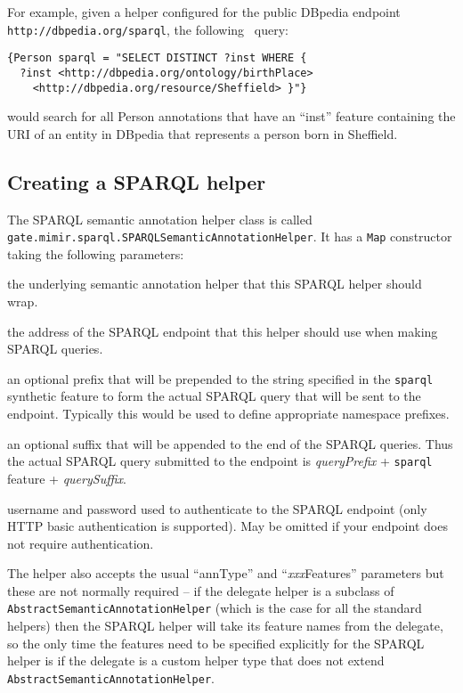 For example, given a helper configured for the public DBpedia endpoint
{\tt http://dbpedia.org/sparql}, the following \Mimir\ query:
\begin{verbatim}
{Person sparql = "SELECT DISTINCT ?inst WHERE {
  ?inst <http://dbpedia.org/ontology/birthPlace>
    <http://dbpedia.org/resource/Sheffield> }"}
\end{verbatim}
would search for all Person annotations that have an ``inst'' feature
containing the URI of an entity in DBpedia that represents a person born in
Sheffield.


\subsection{Creating a SPARQL helper}

The SPARQL semantic annotation helper class is called
\lstinline!gate.mimir.sparql.SPARQLSemanticAnnotationHelper!.  It has a
{\tt Map} constructor taking the following parameters:

\bde
\item[delegate (required)] the underlying semantic annotation helper that this
  SPARQL helper should wrap.
\item[sparqlEndpoint (required)] the address of the SPARQL endpoint that this
  helper should use when making SPARQL queries.
\item[queryPrefix] an optional prefix that will be prepended to the string
  specified in the {\tt sparql} synthetic feature to form the actual SPARQL
  query that will be sent to the endpoint.  Typically this would be used to
  define appropriate namespace prefixes.
\item[querySuffix] an optional suffix that will be appended to the end of the
  SPARQL queries.  Thus the actual SPARQL query submitted to the endpoint is
  {\em queryPrefix} + {\tt sparql} feature + {\em querySuffix}.
\item[sparqlEndpointUser and sparqlEndpointPassword] username and password used
  to authenticate to the SPARQL endpoint (only HTTP basic authentication is
  supported).  May be omitted if your endpoint does not require authentication.
\ede

The helper also accepts the usual ``annType'' and ``{\em xxx}Features''
parameters but these are not normally required -- if the delegate helper is a
subclass of {\tt AbstractSemanticAnnotationHelper} (which is the case for all
the standard helpers) then the SPARQL helper will take its feature names from
the delegate, so the only time the features need to be specified explicitly for
the SPARQL helper is if the delegate is a custom helper type that does not
extend {\tt AbstractSemanticAnnotationHelper}.

